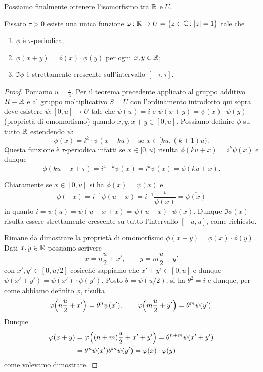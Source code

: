 Possiamo finalmente ottenere l'isomorfismo tra ${\mathbb R}$ e $U$.
\begin{theorem}
Fissato $\tau > 0$ esiste una unica funzione 
$\varphi\colon {\mathbb R} \to U = {\left\{ z\in {\mathbb C}\colon {\left|z\right|}=1 \right\}}$ 
tale che 
%
%
\begin{enumerate}
  \item $\phi$ è $\tau$-periodica;
  \item $\phi(x+y)=\phi(x)\cdot \phi(y)$ per ogni $x,y\in {\mathbb R}$;
  \item $\Im \phi$ è strettamente crescente sull'intervallo $[-\tau,\tau]$.
\end{enumerate}
\end{theorem}
%
\begin{proof}
  Poniamo $u=\frac{\tau}4$.
  Per il teorema precedente applicato 
  al gruppo additivo $R={\mathbb R}$ e al gruppo moltiplicativo $S=U$
  con l'ordinamento introdotto qui sopra deve esistere
  $\psi\colon[0,u]\to U$ tale che $\psi(u)=i$
  e $\psi(x+y)=\psi(x)\cdot \psi(y)$ (proprietà di omomorfismo) 
  quando $x,y,x+y \in [0,u]$.
  Possiamo definire $\phi$ su tutto ${\mathbb R}$ estendendo $\psi$:
  \[
    \phi(x) =
      i^k\cdot \psi(x-ku) \quad \text{se $x\in [k u,(k+1)u)$}.
  \]
  Questa funzione è $\tau$-periodica infatti
  se $x\in [0,u)$ risulta
  $\phi(ku+x) = i^{k} \psi(x)$
  e dunque 
  \[
    \phi(ku+x+\tau) = i^{4+k} \psi(x) = i^k \psi(x) = \phi(ku+x).
  \]

  Chiaramente se $x\in[0,u]$ 
  si ha $\phi(x) = \psi(x)$ 
  e 
  \[
    \phi(-x) = i^{-1}\psi(u-x) = i^{-1}\frac{i}{\psi(x)} = \overline{\psi(x)}
  \]
  in quanto $i=\psi(u)=\psi(u-x+x) = \psi(u-x)\cdot \psi(x)$.
  Dunque $\Im \phi(x)$ risulta essere strettamente crescente su tutto 
  l'intervallo $[-u,u]$, come richiesto.

  Rimane da dimostrare la proprietà di omomorfismo $\phi(x+y)=\phi(x)\cdot \phi(y)$. 
  Dati $x,y\in {\mathbb R}$ possiamo scrivere 
  \[
     x= n \frac u 2 + x', \qquad y=m \frac u 2 + y'
  \]
  con $x',y'\in[0,u/2]$ cosicché sappiamo che $x'+y'\in [0,u]$ 
  e dunque $\psi(x'+y') = \psi(x')\cdot \psi(y')$.
  Posto $\theta = \psi(u/2)$, si ha $\theta^2=i$ e dunque,
  per come abbiamo definito $\phi$, risulta 
  \[
    \varphi{\left( n \frac u 2 + x' \right)} = \theta^n \psi(x'),
    \qquad 
    \varphi{\left( m \frac u 2 + y' \right)} = \theta^m \psi(y').
  \]
  Dunque 
  \begin{align*}
    \varphi(x+y) 
    &= \varphi{\left( (n+m)\frac u 2+x'+y' \right)} 
    = \theta^{n+m}\psi(x'+y')\\
    &= \theta^n \psi(x') \theta^m \psi(y')
    = \varphi(x)\cdot \varphi(y)
  \end{align*}
  come volevamo dimostrare.
  \end{proof}

